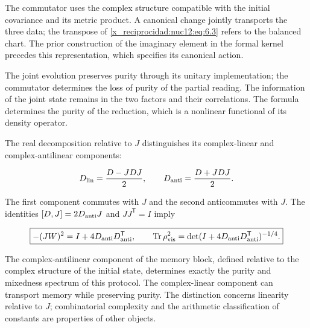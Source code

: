 The commutator uses the complex structure compatible with the initial covariance and its metric product. A canonical change jointly transports the three data; the transpose of \eqref{x_reciprocidad:nuc12:eq:6.3} refers to the balanced chart. The prior construction of the imaginary element in the formal kernel precedes this representation, which specifies its canonical action.

The joint evolution preserves purity through its unitary implementation; the commutator determines the loss of purity of the partial reading. The information of the joint state remains in the two factors and their correlations. The formula determines the purity of the reduction, which is a nonlinear functional of its density operator.

The real decomposition relative to \(J\) distinguishes its complex-linear and complex-antilinear components:



\[
D_{\rm lin}=\frac{D-JDJ}{2},\qquad
D_{\rm anti}=\frac{D+JDJ}{2}.
\]



The first component commutes with \(J\) and the second anticommutes with \(J\). The identities \([D,J]=2D_{\rm anti}J\) and \(JJ^{\mathsf T}=I\) imply



\begin{equation}
\boxed{-(JW)^2=I+4D_{\rm anti}D_{\rm anti}^{\mathsf T},\qquad
\operatorname{Tr}\rho_{\rm vis}^2
=\det(I+4D_{\rm anti}D_{\rm anti}^{\mathsf T})^{-1/4}.}
\label{x_reciprocidad:nuc12:eq:6.6}
\end{equation}



The complex-antilinear component of the memory block, defined relative to the complex structure of the initial state, determines exactly the purity and mixedness spectrum of this protocol. The complex-linear component can transport memory while preserving purity. The distinction concerns linearity relative to \(J\); combinatorial complexity and the arithmetic classification of constants are properties of other objects.

